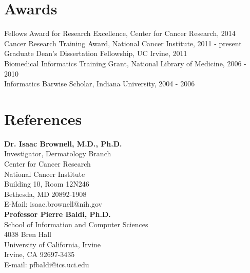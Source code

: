 \documentclass[margin,line]{res}
\begin{document}
\begin{resume}
\section{Awards}
Fellows Award for Research Excellence, Center for Cancer Research, 2014\\
Cancer Research Training Award, National Cancer Institute, 2011 - present\\
Graduate Dean’s Dissertation Fellowship, UC Irvine, 2011\\
Biomedical Informatics Training Grant, National Library of Medicine, 2006 - 2010\\
Informatics Barwise Scholar, Indiana University, 2004 - 2006


\section{\sc References} 

\textbf{Dr. Isaac Brownell, M.D., Ph.D.}\\
Investigator, Dermatology Branch\\
Center for Cancer Research\\
National Cancer Institute\\
Building 10, Room 12N246\\
Bethesda, MD 20892-1908\\
E-Mail: isaac.brownell@nih.gov\\

\textbf{Professor Pierre Baldi, Ph.D.}\\
School of Information and Computer Sciences\\
4038 Bren Hall\\
University of California, Irvine\\
Irvine, CA 92697-3435\\
E-mail: pfbaldi@ics.uci.edu\\

\end{resume}
\end{document}
